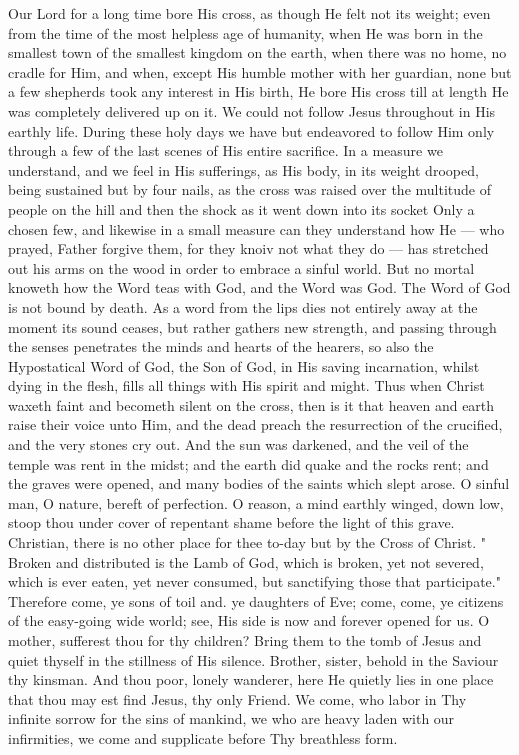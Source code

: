 Our Lord for a long time bore His cross, as 
though He felt not its weight; even from the 
time of the most helpless age of humanity, when 
He was born in the smallest town of the smallest 
kingdom on the earth, when there was no home, 
no cradle for Him, and when, except His humble 
mother with her guardian, none but a few shepherds
took any interest in His birth, He bore 
His cross till at length He was completely delivered
up on it. We could not follow Jesus 
throughout in His earthly life. During these 
holy days we have but endeavored to follow Him 
only through a few of the last scenes of His 
entire sacrifice. In a measure we understand, 
and we feel in His sufferings, as His body, in its 
weight drooped, being sustained but by four 
nails, as the cross was raised over the multitude 
of people on the hill and then the shock as it
went down into its socket Only a chosen few, 
and likewise in a small measure can they understand
how He — who prayed, Father forgive 
them, for they knoiv not what they do — has 
stretched out his arms on the wood in order to 
embrace a sinful world. But no mortal knoweth 
how the Word teas with God, and the Word 
was God. The Word of God is not bound by 
death. As a word from the lips dies not entirely 
away at the moment its sound ceases, but rather 
gathers new strength, and passing through the 
senses penetrates the minds and hearts of the 
hearers, so also the Hypostatical Word of God, 
the Son of God, in His saving incarnation, 
whilst dying in the flesh, fills all things with 
His spirit and might. Thus when Christ waxeth 
faint and becometh silent on the cross, then is it 
that heaven and earth raise their voice unto Him, 
and the dead preach the resurrection of the 
crucified, and the very stones cry out. And the 
sun was darkened, and the veil of the temple 
was rent in the midst; and the earth did quake 
and the rocks rent; and the graves were opened, 
and many bodies of the saints which slept arose. 
O sinful man, O nature, bereft of perfection. 
O reason, a mind earthly winged, down low, 
stoop thou under cover of repentant shame before
the light of this grave. Christian, there is 
no other place for thee to-day but by the Cross 
of Christ. " Broken and distributed is the Lamb 
of God, which is broken, yet not severed, which 
is ever eaten, yet never consumed, but sanctifying
those that participate." Therefore come, ye 
sons of toil and. ye daughters of Eve; come, 
come, ye citizens of the easy-going wide world; 
see, His side is now and forever opened for us. 
O mother, sufferest thou for thy children? Bring 
them to the tomb of Jesus and quiet thyself in 
the stillness of His silence. Brother, sister, 
behold in the Saviour thy kinsman. And thou 
poor, lonely wanderer, here He quietly lies in 
one place that thou may est find Jesus, thy only 
Friend. We come, who labor in Thy infinite 
sorrow for the sins of mankind, we who are 
heavy laden with our infirmities, we come and 
supplicate before Thy breathless form. 

